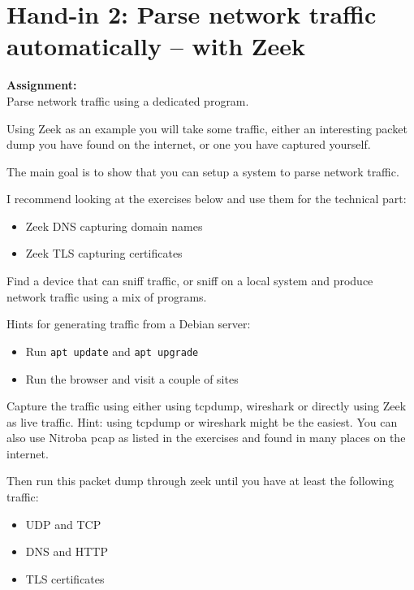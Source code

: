 \documentclass[a4paper,11pt,notitlepage]{report}
\begin{document}
\rm
{}

\newcommand{\course}[1]{KEA Kompetence Penetration Testing\\ exercises}




\setcounter{tocdepth}{0}

\normal

\chapter*{Hand-in 2: Parse network traffic automatically -- with Zeek}

{\bf Assignment:}\\
Parse network traffic using a dedicated program.

Using Zeek as an example you will take some traffic, either an interesting packet dump you have found on the internet, or one you have captured yourself.

The main goal is to show that you can setup a system to parse network traffic.

I recommend looking at the exercises below and use them for the technical part:
\begin{itemize}
\item Zeek DNS capturing domain names
\item Zeek TLS capturing certificates
\end{itemize}

Find a device that can sniff traffic, or sniff on a local system and produce network traffic using a mix of programs.

Hints for generating traffic from a Debian server:
\begin{itemize}
\item Run \verb+apt update+ and \verb+apt upgrade+
\item Run the browser and visit a couple of sites
\end{itemize}

Capture the traffic using either using tcpdump, wireshark or directly using Zeek as live traffic. Hint: using tcpdump or wireshark might be the easiest. You can also use Nitroba pcap as listed in the exercises and found in many places on the internet.

Then run this packet dump through zeek until you have at least the following traffic:
\begin{itemize}
\item UDP and TCP
\item DNS and HTTP
\item TLS certificates
\end{itemize}
\end{document}
